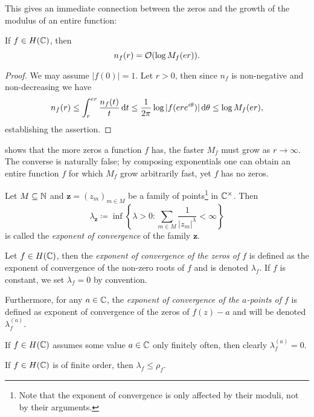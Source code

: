 This gives an immediate connection between the zeros and the growth of the modulus of an entire function:

\begin{lemma} \label{lem:zeros-bounded-by-modulus}
    If $f \in H(\mathbb{C})$, then
    $$ n_f(r) = \mathcal{O}( \log M_f(er) ). $$
\end{lemma}

\begin{proof}
    We may assume $\vert f(0) \vert = 1$. Let $r > 0$, then since $n_f$ is non-negative and non-decreasing we have
    \begin{equation*}
        n_f(r) \leq \int_r^{er} \frac{n_f(t)}{t} \mathop{}\!\mathrm{d} t \leq \frac{1}{2 \pi} \log \vert f(er e^{i \theta}) \vert \mathop{}\!\mathrm{d} \theta \leq \log M_f(er),
    \end{equation*}
    establishing the assertion.
\end{proof}

 shows that the more zeros a function $f$ has, the faster $M_f$ must grow as $r \to \infty$. The converse is naturally false; by composing exponentials one can obtain an entire function $f$ for which $M_f$ grow arbitrarily fast, yet $f$ has no zeros.

\begin{definition} \label{def:zero-exponent}
    Let $M \subseteq \mathbb{N}$ and $\mathbf{z} = (z_m)_{m \in M}$ be a family of points\footnote{Note that the exponent of convergence is only affected by their moduli, not by their arguments.} in $\mathbb{C}^\times$. Then
    $$ \lambda_{\mathbf{z}} \coloneqq \inf \left\{ \lambda > 0 : \sum_{m \in M} \frac{1}{\vert z_m \vert^\lambda} < \infty \right\} $$
    is called the \emph{exponent of convergence} of the family $\mathbf{z}$.

    Let $f \in H(\mathbb{C})$, then the \emph{exponent of convergence of the zeros of $f$} is defined as the exponent of convergence of the non-zero roots of $f$ and is denoted $\lambda_f$. If $f$ is constant, we set $\lambda_f = 0$ by convention.

    Furthermore, for any $a \in \mathbb{C}$, the \emph{exponent of convergence of the $a$-points of $f$} is defined as exponent of convergence of the zeros of $f(z) - a$ and will be denoted $\lambda_f^{(a)}$.
\end{definition}

If $f \in H(\mathbb{C})$ assumes some value $a \in \mathbb{C}$ only finitely often, then clearly $\lambda_f^{(a)} = 0$.

\begin{theorem} \label{thm:inequality-order-exponent-of-convergence}
    If $f \in H(\mathbb{C})$ is of finite order, then $\lambda_f \leq \rho_f$.
\end{theorem}

